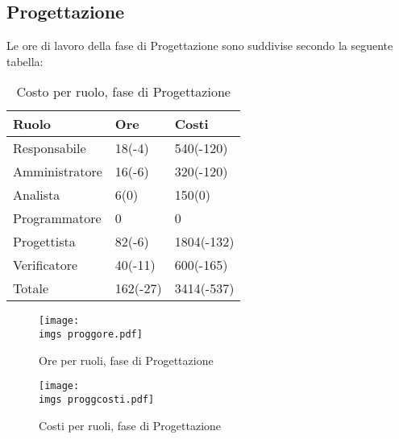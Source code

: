 {\subsection{Progettazione}{
	Le ore di lavoro della fase di Progettazione sono suddivise secondo la seguente tabella:
	\begin{table}[H]
	 	\centering
	  \begin{tabular}{p{}p{}
	  		  				p{}}
		  \toprule Ruolo & Ore  & Costi \\
		  \midrule
		  Responsabile & 18(-4)  & 540(-120) \\
		  Amministratore & 16(-6)  & 320(-120) \\
		  Analista & 6(0)   & 150(0) \\
		  Programmatore & 0   & 0 \\
		  Progettista & 82(-6)  & 1804(-132) \\
		  Verificatore & 40(-11)  & 600(-165) \\
		  \hline
		  Totale & 162(-27)  & 3414(-537) \\
		  \bottomrule
	  \end{tabular}
	 	\label{tab:costoprogettazione}
		\caption{Costo per ruolo, fase di Progettazione}
	\end{table}
	
	\begin{figure}[H]
		\centering
		\texttt{[image: \\imgs proggore.pdf]}
		\label{fig:oreprogettazione}
		\caption{Ore per ruoli, fase di Progettazione}
	\end{figure}
	\begin{figure}[H]
		\centering
		\texttt{[image: \\imgs proggcosti.pdf]}
		\label{fig:costoprogettazione}
		\caption{Costi per ruoli, fase di Progettazione}
	\end{figure}
}
}
